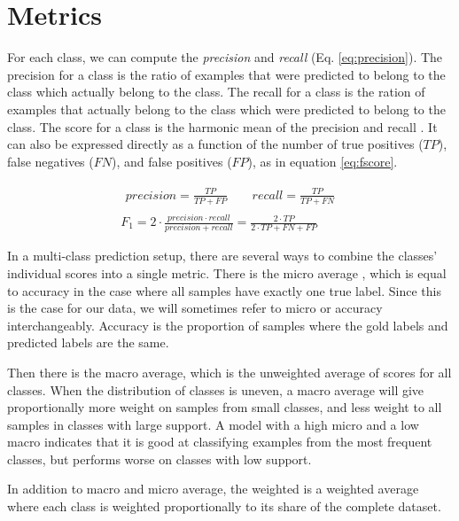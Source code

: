 \section{Metrics} \label{sec:metrics}

For each class, we can compute the \emph{precision} and \emph{recall} (Eq.
\ref{eq:precision}). The precision for a class is the ratio of examples that
were predicted to belong to the class which actually belong to the class. The
recall for a class is the ration of examples that actually belong to the
class which were predicted to belong to the class. The \FI score for a class
is the harmonic mean of the precision and recall . It can also be expressed
directly as a function of the number of true positives ($TP$), false
negatives ($FN$), and false positives ($FP$), as in equation \ref{eq:fscore}.

\begin{gather}
  \begin{aligned}\label{eq:precision}
    precision = \frac{TP}{TP + FP} \qquad recall = \frac{TP}{TP + FN}
  \end{aligned}
  \\[2ex]
  F_1 = 2\cdot\frac{precision\cdot recall}{precision+recall}
      = {\frac{2\cdot TP}{2\cdot TP + FN + FP}}\label{eq:fscore}
\end{gather}

In a multi-class prediction setup, there are several ways to combine the
classes' individual \FI scores into a single metric. There is the micro
average \FI, which is equal to accuracy in the case where all samples have
exactly one true label. Since this is the case for our data, we will
sometimes refer to micro \FI or accuracy interchangeably. Accuracy is the
proportion of samples where the gold labels and predicted labels are the
same.

Then there is the macro average, which is the unweighted average of \FI
scores for all classes. When the distribution of classes is uneven, a macro
average will give proportionally more weight on samples from small classes,
and less weight to all samples in classes with large support. A model with a
high micro \FI and a low macro \FI indicates that it is good at classifying
examples from the most frequent classes, but performs worse on classes with
low support.

In addition to macro and micro average, the weighted \FI is a weighted
average where each class is weighted proportionally to its share of the
complete dataset.

